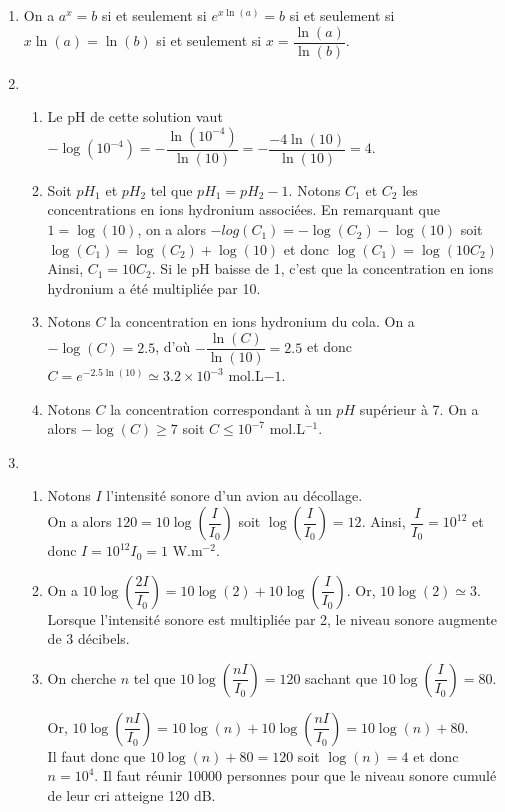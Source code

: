 \documentclass[11pt,fleqn, openany]{book} %
\begin{document}
\begin{solution}\hspace{0pt}

\begin{enumerate}
\item On a $a^x=b$ si et seulement si $e^{x\ln(a)}=b$ si et seulement si $x\ln(a)=\ln(b)$ si et seulement si $x=\dfrac{\ln(a)}{\ln(b)}$.
\item \begin{enumerate}
\item Le pH de cette solution vaut $-\log(10^{-4})=-\dfrac{\ln(10^{-4})}{\ln(10)}=-\dfrac{-4 \ln(10)}{\ln(10)}=4$.
\item Soit $pH_1$ et $pH_2$ tel que $pH_1=pH_2-1$. Notons $C_1$ et $C_2$ les concentrations en ions hydronium associées. En remarquant que $1=\log(10)$, on a alors $-log(C_1)=-\log(C_2)-\log(10)$ soit $\log(C_1)=\log(C_2)+ \log(10)$ et donc $\log(C_1)=\log(10C_2)$ Ainsi, $C_1=10C_2$. Si le pH baisse de 1, c'est que la concentration en ions hydronium a été multipliée par 10.
\item Notons $C$ la concentration en ions hydronium du cola. On a $-\log(C)=2.5$, d'où $-\dfrac{\ln(C)}{\ln(10)}=2.5$ et donc $C=e^{-2.5\ln(10)}\simeq 3.2 \times 10^{-3}$ mol.L${-1}$.
\item Notons $C$ la concentration correspondant à un $pH$ supérieur à 7. On a alors $-\log(C) \geqslant 7$ soit $C \leqslant 10^{-7}$ mol.L$^{-1}$.
\end{enumerate}
\item \begin{enumerate}
\item Notons $I$ l'intensité sonore d'un avion au décollage. \\ On a alors $120=10\log\left(\dfrac{I}{I_0}\right)$ soit $\log\left(\dfrac{I}{I_0}\right)=12$. Ainsi, $\dfrac{I}{I_0}=10^{12}$ et donc $I=10^{12}I_0=1$ W.m$^{-2}$.
\item On a $10\log\left(\dfrac{2I}{I_0}\right)=10\log(2)+10\log\left(\dfrac{I}{I_0}\right)$. Or, $10 \log(2) \simeq 3$. Lorsque l'intensité sonore est multipliée par 2, le niveau sonore augmente de 3 décibels.
\item On cherche $n$ tel que $10\log\left(\dfrac{nI}{I_0}\right)=120$ sachant que $10\log\left(\dfrac{I}{I_0}\right)=80$. 

Or, $10\log\left(\dfrac{nI}{I_0}\right)=10\log\left(n\right)+10\log\left(\dfrac{nI}{I_0}\right)=10\log(n)+80$. \\Il faut donc que $10\log(n)+80=120$ soit $\log(n)=4$ et donc $n=10^4$. Il faut réunir 10000 personnes pour que le niveau sonore cumulé de leur cri atteigne 120 dB.
\end{enumerate}
\end{enumerate}

\end{solution}
\end{document}
